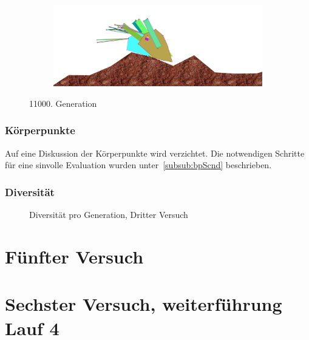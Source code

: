 \begin{figure}[H]
\begin{subfigure}[b]{0.45\textwidth}
                \includegraphics[width=\linewidth,center]{graphics/simulation-results/4_gen11000_4}
                \caption{\label{fig:gen11000_4}}
              \end{subfigure}
              \caption{11000. Generation \label{fig:gen11000}}
            \end{figure}

          \subsubsection{Körperpunkte}

            Auf eine Diskussion der Körperpunkte wird verzichtet.
            Die notwendigen Schritte für eine sinvolle Evaluation wurden unter~\vref{subsub:bpScnd} beschrieben.

          \subsubsection{Diversität}

            \begin{figure}[H]
              \centering
              
              \caption{Diversität pro Generation, Dritter Versuch\label{fig:graphDivFourth}}
            \end{figure}

    \section{Fünfter Versuch}

    \section{Sechster Versuch, weiterführung Lauf 4 \label{sec:sixthSimulation}}
